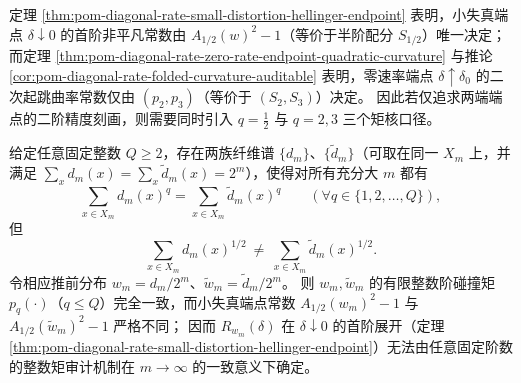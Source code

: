 
\begin{remark}[端点二阶审计的矩核族]\label{rem:pom-diagonal-rate-endpoint-three-kernel-principle}
定理 \ref{thm:pom-diagonal-rate-small-distortion-hellinger-endpoint} 表明，小失真端点 \(\delta\downarrow 0\) 的首阶非平凡常数由 \(A_{1/2}(w)^2-1\)（等价于半阶配分 \(S_{1/2}\)）唯一决定；
而定理 \ref{thm:pom-diagonal-rate-zero-rate-endpoint-quadratic-curvature} 与推论 \ref{cor:pom-diagonal-rate-folded-curvature-auditable} 表明，零速率端点 \(\delta\uparrow\delta_0\) 的二次起跳曲率常数仅由 \((p_2,p_3)\)（等价于 \((S_2,S_3)\)）决定。
因此若仅追求两端端点的二阶精度刻画，则需要同时引入 \(q=\tfrac12\) 与 \(q=2,3\) 三个矩核口径。
\end{remark}

\begin{theorem}[有限整数碰撞矩不足以替代 \texorpdfstring{$q=\tfrac12$}{q=1/2} 端点常数]\label{thm:pom-finite-integer-moments-cannot-replace-half}
给定任意固定整数 \(Q\ge 2\)，存在两族纤维谱 \(\{d_m\}\)、\(\{\widetilde d_m\}\)（可取在同一 \(X_m\) 上，并满足 \(\sum_x d_m(x)=\sum_x \widetilde d_m(x)=2^m\)），使得对所有充分大 \(m\) 都有
\[
\sum_{x\in X_m} d_m(x)^q=\sum_{x\in X_m}\widetilde d_m(x)^q\qquad(\forall q\in\{1,2,\dots,Q\}),
\]
但
\[
\sum_{x\in X_m} d_m(x)^{1/2}\ \ne\ \sum_{x\in X_m}\widetilde d_m(x)^{1/2}.
\]
令相应推前分布 \(w_m=d_m/2^m\)、\(\widetilde w_m=\widetilde d_m/2^m\)。
则 \(w_m,\widetilde w_m\) 的有限整数阶碰撞矩 \(p_q(\cdot)\)（\(q\le Q\)）完全一致，而小失真端点常数 \(A_{1/2}(w_m)^2-1\) 与 \(A_{1/2}(\widetilde w_m)^2-1\) 严格不同；
因而 \(R_{w_m}(\delta)\) 在 \(\delta\downarrow 0\) 的首阶展开（定理 \ref{thm:pom-diagonal-rate-small-distortion-hellinger-endpoint}）无法由任意固定阶数的整数矩审计机制在 \(m\to\infty\) 的一致意义下确定。
\end{theorem}
